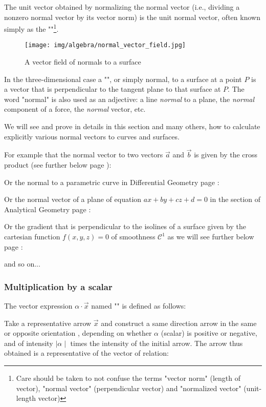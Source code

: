 	The unit vector obtained by normalizing the normal vector (i.e., dividing a nonzero normal vector by its vector norm) is the unit normal vector, often known simply as the ""\footnote{Care should be taken to not confuse the terms "vector norm" (length of vector), "normal vector" (perpendicular vector) and "normalized vector" (unit-length vector)}.
	\begin{figure}[H]
		\centering
		\texttt{[image: img/algebra/normal\_vector\_field.jpg]}
		\caption{A vector field of normals to a surface}
	\end{figure}
	In the three-dimensional case a "", or simply normal, to a surface at a point $P$ is a vector that is perpendicular to the tangent plane to that surface at $P$. The word "normal" is also used as an adjective: a line \textit{normal} to a plane, the \textit{normal} component of a force, the \textit{normal} vector, etc. 
	
	We will see and prove in details in this section and many others, how to calculate explicitly various normal vectors to curves and surfaces.
	
	For example that the normal vector to two vectors $\vec{a}$ and $\vec{b}$ is given by the cross product (see further below page \pageref{cross product}):
	
	Or the normal to a parametric curve in Differential Geometry page \pageref{first Frenet formula}:
	
	Or the normal vector of a plane of equation $ax+by+cz+d=0$ in the section of Analytical Geometry page \pageref{vector normal plane}:
	
	Or the gradient that is perpendicular to the isolines of a surface given by the cartesian function $f(x,y,z)=0$ of smoothness $\mathcal{C}^1$ as we will see further below page \pageref{gradient normal}:
	
	and so on...
	
	

\pagebreak
\subsubsection{Multiplication by a scalar}
The vector expression $\alpha\cdot \vec{x}$ named "" is defined as follows:

Take a representative arrow $\vec{x}$ and construct a same direction arrow in the same or opposite orientation , depending on whether $\alpha$ (scalar) is positive or negative, and of intensity $\mid \alpha \mid$ times the intensity of the initial arrow. The arrow thus obtained is a representative of the vector of relation:
	
